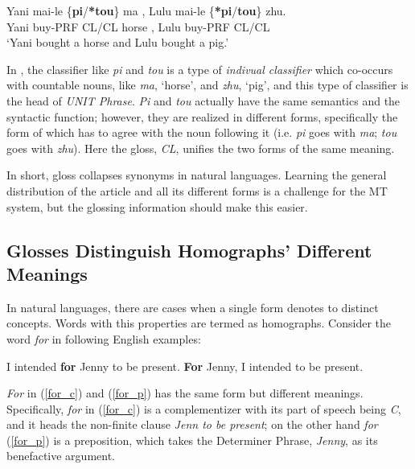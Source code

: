 \begin{exe}
\ex \label{chinese_cl_eg}
\gll Yani mai-le \{\textbf{pi}/\textbf{*tou}\} ma , Lulu mai-le \{\textbf{*pi}/\textbf{tou}\} zhu.\\ 
Yani buy-PRF CL/CL horse , Lulu buy-PRF CL/CL\\
\glt `Yani bought a horse and Lulu bought a pig.' \citep[p. 136]{zhang2013classifier}
\end{exe}

In \citet{zhang2013classifier}, the classifier like \textit{pi} and \textit{tou} is a type of \textit{indivual classifier} which co-occurs with countable nouns, like \textit{ma}, `horse', and \textit{zhu}, `pig', and this type of classifier is the head of \textit{UNIT Phrase}. 
\textit{Pi} and \textit{tou} actually have the same semantics and the syntactic function; however, they are realized in different forms, specifically the form of which has to agree with the noun following it (i.e. \textit{pi} goes with \textit{ma}; \textit{tou} goes with \textit{zhu}). Here the gloss, \textit{CL}, unifies the two forms of the same meaning.    

In short, gloss collapses synonyms in natural languages. Learning the general distribution of the article and all its different forms is a challenge for the MT system, but the glossing information should make this easier.

\subsection{Glosses Distinguish Homographs' Different Meanings}
In natural languages, there are cases when a single form denotes to distinct concepts. Words with this properties are termed as homographs. Consider the word \textit{for} in following English examples:

\begin{exe}
\ex \label{for_eng}
	\begin{xlist}
	\ex \label{for_c}I intended \textbf{for} Jenny to be present.
	\ex \label{for_p}\textbf{For} Jenny, I intended to be present. \citep[p.306-307]{adger2003core}
	\end{xlist}
\end{exe}

\textit{For} in (\ref{for_c}) and (\ref{for_p}) has the same form but different meanings. Specifically, \textit{for} in (\ref{for_c}) is a complementizer with its part of speech being \textit{C}, and it heads the non-finite clause \textit{Jenn to be present}; on the other hand \textit{for} (\ref{for_p}) is a preposition, which takes the Determiner Phrase, \textit{Jenny}, as its benefactive argument.   

